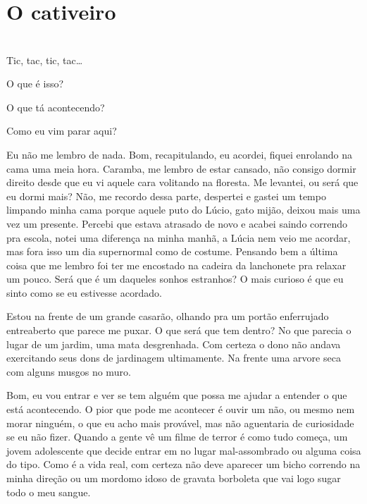 \newpage

\ifdefined\useChapters
\chapter{O cativeiro}
\else
\chapter{}
\fi


Tic, tac, tic, tac…

O que é isso?

O que tá acontecendo?

Como eu vim parar aqui?

Eu não me lembro de nada. Bom, recapitulando, eu acordei, fiquei enrolando na cama uma meia hora. Caramba, me lembro de estar cansado, não consigo dormir direito desde que eu vi aquele cara volitando na floresta. Me levantei, ou será que eu dormi mais? Não, me recordo dessa parte, despertei e gastei um tempo limpando minha cama porque aquele puto do Lúcio, gato mijão, deixou mais uma vez um presente. Percebi que estava atrasado de novo e acabei saindo correndo pra escola, notei uma diferença na minha manhã, a Lúcia nem veio me acordar, mas fora isso um dia supernormal como de costume. Pensando bem a última coisa que me lembro foi ter me encostado na cadeira da lanchonete pra relaxar um pouco. Será que é um daqueles sonhos estranhos? O mais curioso é que eu sinto como se eu estivesse acordado.

Estou na frente de um grande casarão, olhando pra um portão enferrujado entreaberto que parece me puxar. O que será que tem dentro? No que parecia o lugar de um jardim, uma mata desgrenhada. Com certeza o dono não andava exercitando seus dons de jardinagem ultimamente. Na frente uma arvore seca com alguns musgos no muro.

Bom, eu vou entrar e ver se tem alguém que possa me ajudar a entender o que está acontecendo. O pior que pode me acontecer é ouvir um não, ou mesmo nem morar ninguém, o que eu acho mais provável, mas não aguentaria de curiosidade se eu não fizer. Quando a gente vê um filme de terror é como tudo começa, um jovem adolescente que decide entrar em no lugar mal-assombrado ou alguma coisa do tipo. Como é a vida real, com certeza não deve aparecer um bicho correndo na minha direção ou um mordomo idoso de gravata borboleta que vai logo sugar todo o meu sangue.

